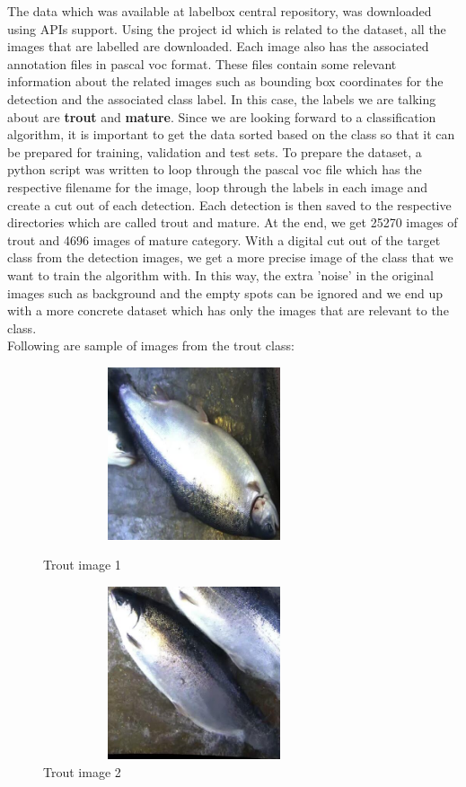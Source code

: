 The data which was available at labelbox central repository, was downloaded using APIs support. Using the project id which is related to the dataset, all the images that are labelled are downloaded. Each image also has the associated annotation files in pascal voc format. These files contain some relevant information about the related images such as bounding box coordinates for the detection and the associated class label. In this case, the labels we are talking about are \textbf{trout} and \textbf{mature}. Since we are looking forward to a classification algorithm, it is important to get the data sorted based on the class so that it can be prepared for training, validation and test sets. To prepare the dataset, a python script was written to loop through the pascal voc file which has the respective filename for the image, loop through the labels in each image and create a cut out of each detection. Each detection is then saved to the respective directories which are called trout and mature. At the end, we get 25270 images of trout and 4696 images of mature category. With a digital cut out of the target class from the detection images, we get a more precise image of the class that we want to train the algorithm with. In this way, the extra 'noise' in the original images such as background and the empty spots can be ignored and we end up with a more concrete dataset which has only the images that are relevant to the class. \\

Following are sample of images from the trout class:
\begin{figure}[H]
  \centering
  \begin{minipage}[b]{0.4\textwidth}
    \centering
    \includegraphics[width=3.5in, height=2in, keepaspectratio]{Figures/trout1.jpg}
    \caption{Trout image 1}
    \label{fig:trout1}
  \end{minipage}
  \hfill
  \begin{minipage}[b]{0.4\textwidth}
    \centering
    \includegraphics[width=3.5in, height=2in, keepaspectratio]{Figures/trout2.jpg}
    \caption{Trout image 2}
    \label{fig:trout2}
  \end{minipage}
\end{figure}

